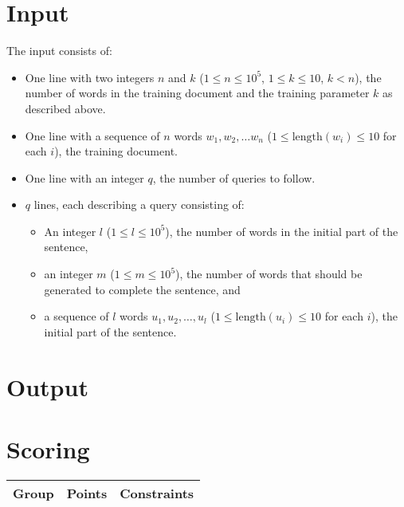 \section*{Input}
The input consists of:
\begin{itemize}
  \item One line with two integers $n$ and $k$ ($1 \leq n \leq 10^5$, $1 \leq k
       \leq 10$, $k < n$), the number of words in the training document and the training
        parameter $k$ as described above.
  \item One line with a sequence of $n$ words $w_1, w_2, \ldots w_n$ ($1 \leq
        \mathrm{length}(w_i) \leq 10$ for each $i$), the training document.
  \item One line with an integer $q$, the number of queries to follow.
  \item $q$ lines, each describing a query consisting of:
    \begin{itemize}
      \item An integer $l$ ($1 \leq l \leq 10^5$), the number of words in the
            initial part of the sentence,
      \item an integer $m$ ($1 \leq m \leq 10^5$), the number of words that
            should be generated to complete the sentence, and
      \item a sequence of $l$ words $u_1, u_2, \ldots, u_l$ ($1 \leq
            \mathrm{length}(u_i) \leq 10$ for each $i$), the initial part of the sentence.
    \end{itemize}
\end{itemize}

\section*{Output}

\section*{Scoring}
\begin{tabular}{|l|l|l|}
    \hline
    Group & Points & Constraints \\ \hline
\end{tabular}

